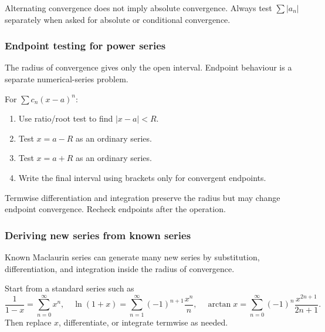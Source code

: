 \begin{commonmistake}
Alternating convergence does not imply absolute convergence.  Always test
\(\sum |a_n|\) separately when asked for absolute or conditional convergence.
\end{commonmistake}

\newpage
\subsubsection{Endpoint testing for power series}
\begin{extension}
The radius of convergence gives only the open interval.  Endpoint behaviour is
a separate numerical-series problem.
\end{extension}

\begin{examtip}
For \(\sum c_n(x-a)^n\):
\begin{enumerate}[leftmargin=*]
\item Use ratio/root test to find \(|x-a|<R\).
\item Test \(x=a-R\) as an ordinary series.
\item Test \(x=a+R\) as an ordinary series.
\item Write the final interval using brackets only for convergent endpoints.
\end{enumerate}
\end{examtip}

\begin{commonmistake}
Termwise differentiation and integration preserve the radius but may change
endpoint convergence.  Recheck endpoints after the operation.
\end{commonmistake}

\newpage
\subsubsection{Deriving new series from known series}
\begin{extension}
Known Maclaurin series can generate many new series by substitution,
differentiation, and integration inside the radius of convergence.
\end{extension}

\begin{examtip}
Start from a standard series such as
\[
\frac1{1-x}=\sum_{n=0}^\infty x^n,
\quad
\ln(1+x)=\sum_{n=1}^\infty(-1)^{n+1}\frac{x^n}{n},
\quad
\arctan x=\sum_{n=0}^\infty(-1)^n\frac{x^{2n+1}}{2n+1}.
\]
Then replace \(x\), differentiate, or integrate termwise as needed.
\end{examtip}

